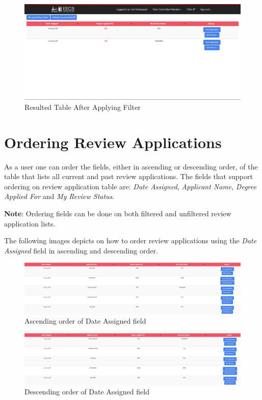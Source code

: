 \documentclass[fontsize=12pt,paper=letter,twoside]{scrartcl}
\begin{document}
\begin{figure}[!htb]
\begin{center}
\includegraphics[width=.9\textwidth]{images/example_filter_table.png}
\end{center}
\caption{Resulted Table After Applying Filter}
\label{fig:resulted_table}
\end{figure}

\clearpage
\newpage
\section{Ordering Review Applications}
As a user one can order the fields, either in ascending or descending order, of the table that lists all current and past review applications. The fields that support ordering on review application table are: \emph{Date Assigned}, \emph{Applicant Name}, \emph{Degree Applied For} and \emph{My Review Status}.

\bigskip
\noindent \textbf{Note}: Ordering fields can be done on both filtered and unfiltered review application lists.

\bigskip
\noindent The following images depicts on how to order review applications using the \emph{Date Assigned} field in ascending and descending order.

\begin{figure}[!htb]
\begin{center}
\includegraphics[width=.9\textwidth]{images/order_ascending.png}
\end{center}
\caption{Ascending order of Date Assigned field}
\label{fig:order_ascending}
\end{figure}

\begin{figure}[!htb]
\begin{center}
\includegraphics[width=.9\textwidth]{images/order_descending.png}
\end{center}
\caption{Descending order of Date Assigned field}
\label{fig:order_descending}
\end{figure}
\end{document}

